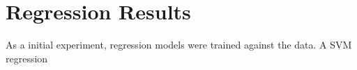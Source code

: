 \section{Regression Results}
As a initial experiment, regression models were trained against the data.
A SVM regression







